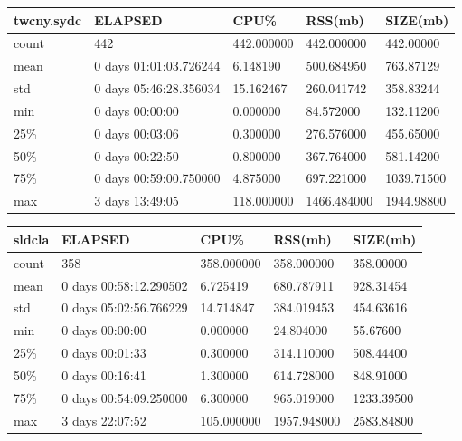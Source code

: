 \documentclass{article}
\begin{document}
\begin{tabular}{|l|l|l|l|l|}
\hline 
\hline twcny.sydc& ELAPSED&   CPU\%&  RSS(mb)&   SIZE(mb) \\
\hline count&    442& 442.000000&  442.000000&  442.00000 \\
\hline mean&  0 days 01:01:03.726244&  6.148190&  500.684950&  763.87129 \\
\hline std&  0 days 05:46:28.356034&  15.162467&  260.041742&  358.83244 \\
\hline min&   0 days 00:00:00&  0.000000&  84.572000&  132.11200 \\
\hline 25\%&   0 days 00:03:06&  0.300000&  276.576000&  455.65000 \\
\hline 50\%&   0 days 00:22:50&  0.800000&  367.764000&  581.14200 \\
\hline 75\%&  0 days 00:59:00.750000&  4.875000&  697.221000& 1039.71500 \\
\hline max&   3 days 13:49:05& 118.000000& 1466.484000& 1944.98800 \\
\hline 
\end{tabular}
 
\begin{tabular}{|l|l|l|l|l|}
\hline 
\hline sldcla& ELAPSED&   CPU\%&  RSS(mb)&   SIZE(mb) \\
\hline count&    358& 358.000000&  358.000000&  358.00000 \\
\hline mean&  0 days 00:58:12.290502&  6.725419&  680.787911&  928.31454 \\
\hline std&  0 days 05:02:56.766229&  14.714847&  384.019453&  454.63616 \\
\hline min&   0 days 00:00:00&  0.000000&  24.804000&  55.67600 \\
\hline 25\%&   0 days 00:01:33&  0.300000&  314.110000&  508.44400 \\
\hline 50\%&   0 days 00:16:41&  1.300000&  614.728000&  848.91000 \\
\hline 75\%&  0 days 00:54:09.250000&  6.300000&  965.019000& 1233.39500 \\
\hline max&   3 days 22:07:52& 105.000000& 1957.948000& 2583.84800 \\
\hline 
\end{tabular}
 
\end{document}
